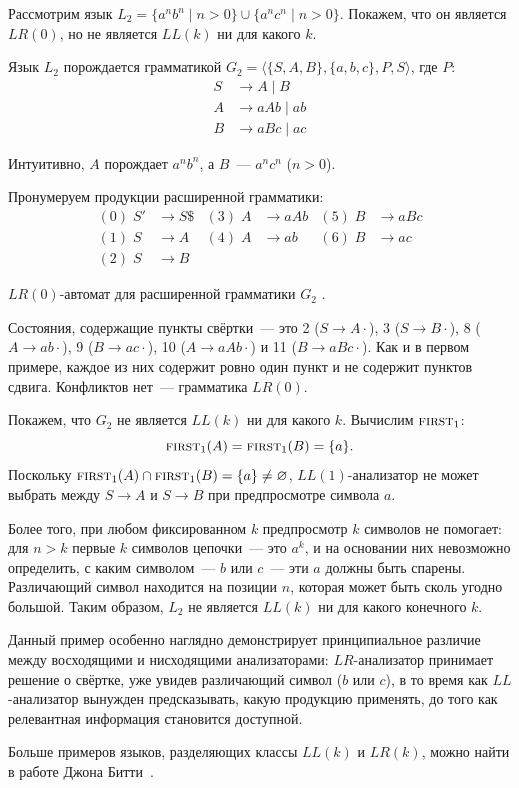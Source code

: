 \begin{example}
\label{exmpl:ll_lr_anbnancn}
Рассмотрим язык $L_2 = \{ a^n b^n \mid n > 0\} \cup \{ a^n c^n \mid n > 0\}$. Покажем, что он является $LR(0)$, но не является $LL(k)$ ни для какого $k$.

Язык $L_2$ порождается грамматикой $G_2 = \langle \{S, A, B\}, \{a, b, c\}, P, S \rangle$, где $P$:
\begin{align*}
  S &\to A \mid B \\
  A &\to a A b \mid a b \\
  B &\to a B c \mid a c
\end{align*}

Интуитивно, $A$ порождает $a^n b^n$, а $B$~--- $a^n c^n$ ($n > 0$).

Пронумеруем продукции расширенной грамматики:
\begin{align*}
  (0)\; S' &\to S \$     & (3)\; A &\to a A b    & (5)\; B &\to a B c \\
  (1)\; S  &\to A         & (4)\; A &\to a b       & (6)\; B &\to a c \\
  (2)\; S  &\to B
\end{align*}

$LR(0)$-автомат для расширенной грамматики $G_2$  .

\begin{center}
  
\end{center}

Состояния, содержащие пункты свёртки~--- это 2 ($S \to A\cdot$), 3 ($S \to B\cdot$), 8 ($A \to ab\cdot$), 9 ($B \to ac\cdot$), 10 ($A \to aAb\cdot$) и 11 ($B \to aBc\cdot$). Как и в первом примере, каждое из них содержит ровно один пункт и не содержит пунктов сдвига. Конфликтов нет~--- грамматика $LR(0)$.

Покажем, что $G_2$ не является $LL(k)$ ни для какого $k$. Вычислим $\text{\textsc{first}}_{1}$:
\[
\text{\textsc{first}}_{1}(A) = \text{\textsc{first}}_{1}(B) = \{a\}.
\]
Поскольку $\text{\textsc{first}}_{1}(A) \cap \text{\textsc{first}}_{1}(B) = \{a\} \neq \varnothing$, $LL(1)$-анализатор не может выбрать между $S \to A$ и $S \to B$ при предпросмотре символа $a$.

Более того, при любом фиксированном $k$ предпросмотр $k$ символов не помогает: для $n > k$ первые $k$ символов цепочки~--- это $a^k$, и на основании них невозможно определить, с каким символом~--- $b$ или $c$~--- эти $a$ должны быть спарены. Различающий символ находится на позиции $n$, которая может быть сколь угодно большой. Таким образом, $L_2$ не является $LL(k)$ ни для какого конечного $k$.

Данный пример особенно наглядно демонстрирует принципиальное различие между восходящими и нисходящими анализаторами: $LR$-анализатор принимает решение о свёртке, уже увидев различающий символ ($b$ или $c$), в то время как $LL$-анализатор вынужден предсказывать, какую продукцию применять, до того как релевантная информация становится доступной.
\end{example}

Больше примеров языков, разделяющих классы $LL(k)$ и $LR(k)$, можно найти в работе Джона Битти~.
